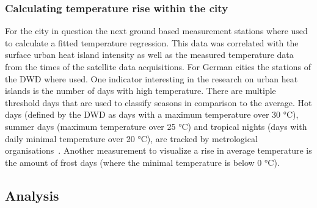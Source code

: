 \documentclass[12pt,a4paper, english,twoside]{article}
\begin{document}
    \subsubsection{Calculating temperature rise within the city}
    For the city in question the next ground based measurement stations where used to calculate a fitted temperature regression. 
    This data %
    was correlated with the surface urban heat island intensity as well as the measured temperature data from the times of the satellite data acquisitions. 
    For German cities the stations of the \gls{DWD} where used.
    One indicator interesting in the research on urban heat islands is the number of days with high temperature.
    There are multiple threshold days that are used to classify seasons in comparison to the average.
    Hot days (defined by the \gls{DWD} as days with a maximum temperature over 30 °C), summer days (maximum temperature over 25 °C) and tropical nights (days with daily minimal temperature over 20 °C), are tracked by metrological organisations~\cite{dwdklimalexikon}.
    Another measurement to visualize a rise in average temperature is the amount of frost days (where the minimal temperature is below 0 °C). 
  \subsection{Analysis}
\end{document}
